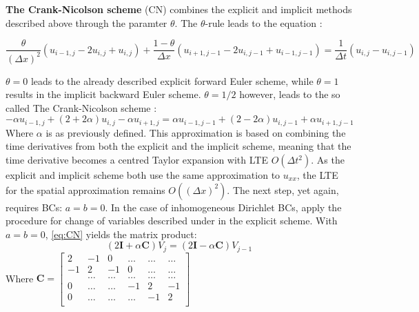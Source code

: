 \documentclass[%
oneside,                 %
final,                   %
10pt]{article}
\begin{document}
\textbf{The Crank-Nicolson scheme} (CN) combines the explicit and implicit methods described above through  the paramter $\theta$. The $\theta$-rule leads to the equation \cite[p.310]{HJ15}: 

\begin{equation}
\frac{\theta}{(\Delta x)^2}(u_{i-1,j}-2u_{i,j}+u_{i,j})+\frac{1-\theta}{\Delta x}(u_{i+1,j-1}-2u_{i,j-1}+u_{i-1,j-1})=\frac{1}{\Delta t}(u_{i,j}-u_{i,j-1})
\label{eq:thetarule}
\end{equation}

$\theta=0$ leads to the already described explicit forward Euler scheme, while $\theta=1$ results in the implicit backward Euler scheme. $\theta=1/2$ however, leads to the so called The Crank-Nicolson scheme \cite[p.311]{HJ15}:
\begin{equation}
-\alpha u_{i-1,j}+(2+2\alpha)u_{i,j} - \alpha u_{i+1,j}=\alpha u_{i-1,j-1}+(2-2\alpha)u_{i,j-1}+\alpha u_{i+1,j-1}
\label{eq:CN}
\end{equation}
Where $\alpha$ is as previously defined. This approximation is based on combining the time derivatives from both the explicit and the implicit scheme, meaning that the time derivative becomes a centred Taylor expansion with LTE $O(\Delta t^2)$. As the explicit and implicit scheme both use the same approximation to $u_{xx}$, the LTE for the spatial approximation remains $O((\Delta x)^2)$. \newline
The next step, yet again, requires BCs: $a=b=0$.  In the case of inhomogeneous Dirichlet BCs, apply the procedure for change of variables described under in the explicit scheme. With $a=b=0$,  \eqref{eq:CN} yields the matrix product:
\begin{equation}
(2 \mathbf{I}+\alpha \mathbf{C})V_j= (2\mathbf{I}-\alpha \mathbf{C})V_{j-1}
\end{equation}
Where $\mathbf{C} = \begin{bmatrix}
                      		2& -1 & 0 &\dots   & \dots &\dots  \\
                           -1 & 2 & -1 &0 &\dots &\dots \\
                           & \dots & \dots& \dots& \dots & \dots     \\
                           0&  \dots & \dots &-1  &2& -1  \\
                           0&  \dots  &\dots  &\dots  &-1 & 2  \\
                      \end{bmatrix}$
\end{document}
